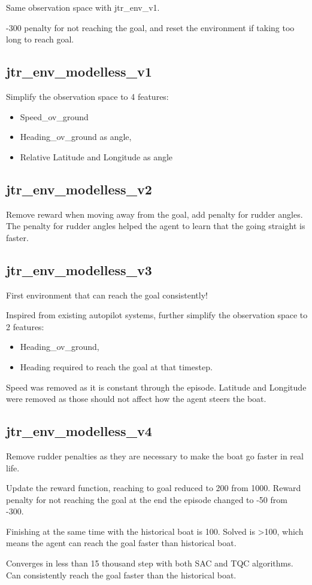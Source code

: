 Same observation space with jtr\_env\_v1.

-300 penalty for not reaching the goal, and reset the environment if taking too long to reach goal.

\subsection*{jtr\_env\_modelless\_v1}
Simplify the observation space to 4 features:
\begin{itemize}
    \item Speed\_ov\_ground
    \item Heading\_ov\_ground as angle,
    \item Relative Latitude and Longitude as angle
\end{itemize}

\subsection*{jtr\_env\_modelless\_v2}
Remove reward when moving away from the goal, add penalty for rudder angles. The penalty for rudder angles helped the agent to learn that the going straight is faster.

\subsection*{jtr\_env\_modelless\_v3}
First environment that can reach the goal consistently!

Inspired from existing autopilot systems, further simplify the observation space to 2 features:
\begin{itemize}
    \item Heading\_ov\_ground,
    \item Heading required to reach the goal at that timestep.
\end{itemize}
Speed was removed as it is constant through the episode. Latitude and Longitude were removed as those should not affect how the agent steers the boat.

\subsection*{jtr\_env\_modelless\_v4}
Remove rudder penalties as they are necessary to make the boat go faster in real life.

Update the reward function, reaching to goal reduced to 200 from 1000. Reward penalty for not reaching the goal at the end the episode changed to -50 from -300.

Finishing at the same time with the historical boat is 100. Solved is >100, which means the agent can reach the goal faster than historical boat.

Converges in less than 15 thousand step with both SAC and TQC algorithms. Can consistently reach the goal faster than the historical boat.